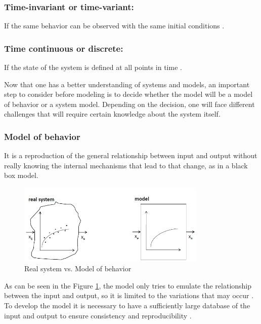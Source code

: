\documentclass{article}
\begin{document}
\begin{doublespacing}
{\subsubsection{Time-invariant or time-variant:}
\par If the same behavior can be observed with the same initial conditions \cite{kaestner:basics}.

\subsubsection{Time continuous or discrete:}
\par If the state of the system is defined at all points in time \cite{kaestner:basics}.

\vspace{5mm}

\par Now that one has a better understanding of systems and models, an important step to consider before modeling is to decide whether the model will be a model of behavior or a system model. Depending on the decision, one will face different challenges that will require certain knowledge about the system itself.

\subsubsection{Model of behavior}
\par It is a reproduction of the general relationship between input and output without really knowing the internal mechanisms that lead to that change, as in a black box model.

\begin{figure}[H] 
    \centering
    \includegraphics[width=0.8\textwidth]{Images/ModelOfBehavior.JPG} 
    \caption{Real system vs. Model of behavior \cite{kaestner:basics}} 
    \label{fig:ModelOfBehavior} 
\end{figure}

\par As can be seen in the Figure \ref{fig:ModelOfBehavior}, the model only tries to emulate the relationship between the input and output, so it is limited to the variations that may occur \cite{kaestner:basics}. To develop the model it is necessary to have a sufficiently large database of the input and output to ensure consistency and reproducibility \cite{kaestner:basics}.


}
\end{doublespacing}
\end{document}
